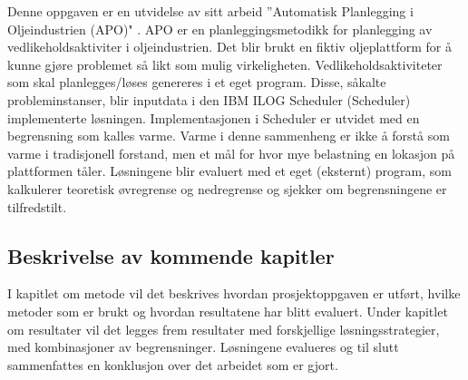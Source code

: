 Denne oppgaven er en utvidelse av \bht sitt arbeid ''Automatisk Planlegging i Oljeindustrien (APO)" \cite{tvedtbezem}. APO er en planleggingsmetodikk for planlegging av vedlikeholdsaktiviter i oljeindustrien. Det blir brukt en fiktiv oljeplattform for å kunne gjøre problemet så likt som mulig virkeligheten. Vedlikeholdsaktiviteter som skal planlegges/løses genereres i et eget program. Disse, såkalte probleminstanser, blir inputdata i den IBM ILOG Scheduler (Scheduler) implementerte løsningen. Implementasjonen i Scheduler er utvidet med en begrensning som kalles varme. Varme i denne sammenheng er ikke å forstå som varme i tradisjonell forstand, men et mål for hvor mye belastning en lokasjon på plattformen tåler. Løsningene blir evaluert med et eget (eksternt) program, som kalkulerer teoretisk øvregrense og nedregrense og sjekker om begrensningene er tilfredstilt.

\subsection{Beskrivelse av kommende kapitler}
I kapitlet om metode vil det beskrives hvordan prosjektoppgaven er utført, hvilke metoder som er brukt og hvordan resultatene har blitt evaluert. Under kapitlet om resultater vil det legges frem resultater med forskjellige løsningsstrategier, med kombinasjoner av begrensninger. Løsningene evalueres og til slutt sammenfattes en konklusjon over det arbeidet som er gjort.